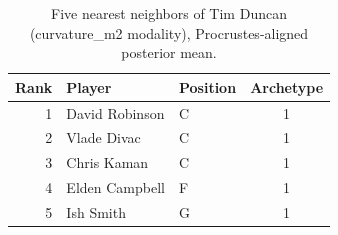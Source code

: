 \begin{table}[htbp]
  \centering\small
  \begin{tabular}{rllc}
    \toprule
    Rank & Player & Position & Archetype \\
    \midrule
    1 & David Robinson & C & 1 \\
    2 & Vlade Divac & C & 1 \\
    3 & Chris Kaman & C & 1 \\
    4 & Elden Campbell & F & 1 \\
    5 & Ish Smith & G & 1 \\
    \bottomrule
  \end{tabular}
  \caption{Five nearest neighbors of Tim Duncan (curvature_m2 modality), Procrustes-aligned posterior mean.}
  \label{tab:Tim_Duncan_neighbors_curvature_m2}
\end{table}

